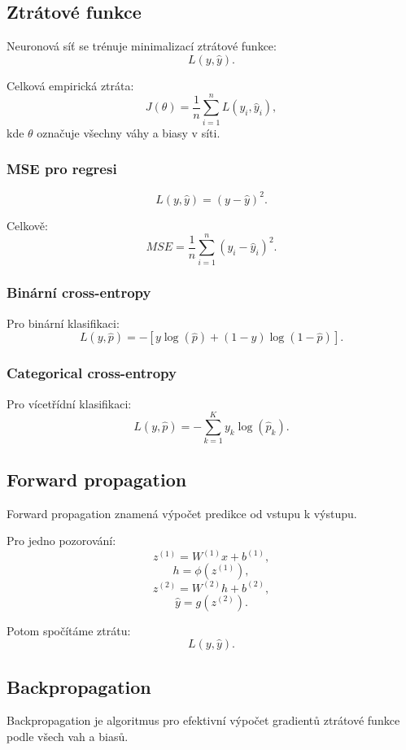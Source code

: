 \subsection{Ztrátové funkce}

Neuronová síť se trénuje minimalizací ztrátové funkce:
\[
L(y,\hat{y}).
\]

Celková empirická ztráta:
\[
J(\theta)
=
\frac{1}{n}
\sum_{i=1}^n
L(y_i,\hat{y}_i),
\]
kde $\theta$ označuje všechny váhy a biasy v síti.

\subsubsection{MSE pro regresi}

\[
L(y,\hat{y})
=
(y-\hat{y})^2.
\]

Celkově:
\[
MSE
=
\frac{1}{n}
\sum_{i=1}^n
(y_i-\hat{y}_i)^2.
\]

\subsubsection{Binární cross-entropy}

Pro binární klasifikaci:
\[
L(y,\hat{p})
=
-
\left[
y\log(\hat{p})
+
(1-y)\log(1-\hat{p})
\right].
\]

\subsubsection{Categorical cross-entropy}

Pro vícetřídní klasifikaci:
\[
L(y,\hat{p})
=
-
\sum_{k=1}^K
y_k\log(\hat{p}_k).
\]

\subsection{Forward propagation}

Forward propagation znamená výpočet predikce od vstupu k výstupu.

Pro jedno pozorování:
\[
z^{(1)}=W^{(1)}x+b^{(1)},
\]
\[
h=\phi(z^{(1)}),
\]
\[
z^{(2)}=W^{(2)}h+b^{(2)},
\]
\[
\hat{y}=g(z^{(2)}).
\]

Potom spočítáme ztrátu:
\[
L(y,\hat{y}).
\]

\subsection{Backpropagation}

Backpropagation je algoritmus pro efektivní výpočet gradientů ztrátové funkce podle všech vah a biasů.

